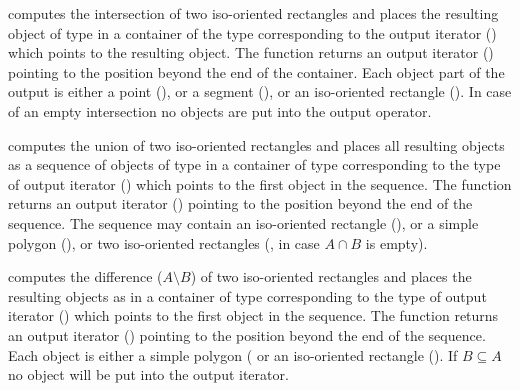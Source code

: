 {computes the intersection of two iso-oriented rectangles and 
places the resulting object 
of type  in a container 
of the type corresponding to 
the output iterator () 
 which points to the resulting object.
The function returns
an output iterator () pointing to the position
beyond the end of the container.
Each object part of the output is either 
 a point (),
or a segment (),
or an iso-oriented rectangle ().
In case of an empty intersection
no objects are put into the output operator.
}


{computes the union of two iso-oriented rectangles and 
places all
resulting objects as a sequence of objects of type 
in a container of type corresponding to the type of
 output iterator () 
 which points to the first object in the
sequence.
The function returns an output iterator () 
pointing to the position beyond the end of the sequence.
The sequence may contain 
 an iso-oriented rectangle (),
or a simple polygon (),
 or two iso-oriented rectangles (, 
 in case $A \cap B$ is empty).
}

{ computes 
the difference ($A \setminus B$) of two iso-oriented
rectangles and places the
resulting objects as 
in a container of type corresponding to the type of 
output iterator ()
 which points to the first object in the
sequence.
The function returns an output iterator () 
pointing to the position beyond the end of the sequence. 
Each object is either
a simple polygon ( or
an iso-oriented rectangle ().
If $B \subseteq A$ no object will be put into the output iterator.
}

